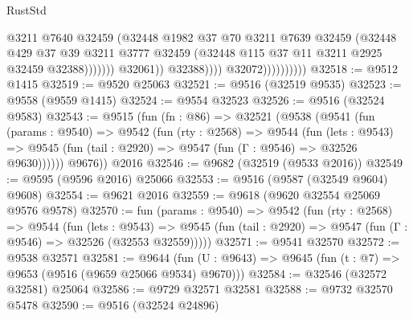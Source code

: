 \begin{lexlean}{RustStd}
\begin{coremodule}
                                            @3211
                                            @7640
                                            @32459
                                            (@32448
                                              @1982
                                              @37
                                              @70
                                              @3211
                                              @7639
                                              @32459
                                              (@32448
                                                @429
                                                @37
                                                @39
                                                @3211
                                                @3777
                                                @32459
                                                (@32448
                                                  @115
                                                  @37
                                                  @11
                                                  @3211
                                                  @2925
                                                  @32459
                                                  @32388)))))))
                                    @32061))
                                @32388))))
                        @32072))))))))))
@32518 := @9512 @1415
@32519 := @9520 @25063
@32521 := @9516 (@32519 @9535)
@32523 := @9558 (@9559 @1415)
@32524 := @9554 @32523
@32526 := @9516 (@32524 @9583)
@32543 := @9515
    (fun (fn : @86) =>
    @32521
      (@9538
        (@9541
          (fun (params : @9540) =>
          @9542
            (fun (rty : @2568) =>
            @9544
              (fun (lets : @9543) =>
              @9545 (fun (tail : @2920) => @9547 (fun (Γ : @9546) => @32526 @9630))))))
        @9676))
    @2016
@32546 := @9682 (@32519 (@9533 @2016))
@32549 := @9595 (@9596 @2016) @25066
@32553 := @9516 (@9587 (@32549 @9604) @9608)
@32554 := @9621 @2016
@32559 := @9618 (@9620 @32554 @25069 @9576 @9578)
@32570 := fun (params : @9540) =>
  @9542
    (fun (rty : @2568) =>
    @9544
      (fun (lets : @9543) =>
      @9545 (fun (tail : @2920) => @9547 (fun (Γ : @9546) => @32526 (@32553 @32559)))))
@32571 := @9541 @32570
@32572 := @9538 @32571
@32581 := @9644
    (fun (U : @9643) => @9645 (fun (t : @7) => @9653 (@9516 (@9659 @25066 @9534) @9670)))
@32584 := @32546 (@32572 @32581) @25064
@32586 := @9729 @32571 @32581
@32588 := @9732 @32570 @5478
@32590 := @9516 (@32524 @24896)

\end{coremodule}
\end{lexlean}
